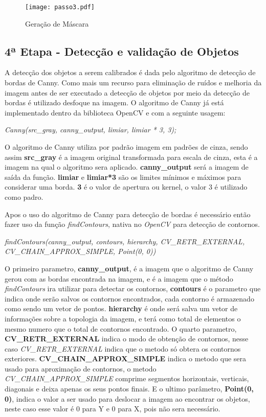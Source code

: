 \begin{figure}[H]
			\centering
			\texttt{[image: passo3.pdf]}
			\caption{Geração de Máscara}
			\label{Configuracao}
		\end{figure}		


\subsection{4ª Etapa - Detecção e validação de Objetos}
A detecção dos objetos a serem calibrados é dada pelo algoritmo de detecção de bordas de Canny. Como mais um recurso para eliminação de ruídos e melhoria da imagem antes de ser executado a detecção de objetos por meio da detecção de bordas é utilizado desfoque na imagem. O algoritmo de Canny já está implementado dentro da biblioteca OpenCV e com a seguinte usagem:
\begin{center}
\centering \textit{  Canny(src\_gray, canny\_output, limiar, limiar * 3, 3);}
\end{center}
O algoritmo de Canny utiliza por padrão imagem em padrões de cinza, sendo assim \textbf{src\_gray} é a imagem original transformada para escala de cinza, esta é a imagem na qual o algoritmo sera aplicado. \textbf{canny\_output} será a imagem de saída da função.
\textbf{limiar} e \textbf{limiar*3} são os limites mínimos e máximos para considerar uma borda. \textbf{3} é o valor de apertura ou kernel, o valor 3 é utilizado como padro.

Apos o uso do algoritmo de Canny para detecção de bordas é necessário então fazer uso da função \textit{findContours}, nativa no \textit{OpenCV} para detecção de contornos.
\begin{center}
\centering \textit{ findContours(canny\_output, contours, hierarchy, CV\_RETR\_EXTERNAL, CV\_CHAIN\_APPROX\_SIMPLE, Point(0, 0))}
\end{center}

O primeiro parametro, \textbf{canny\_output}, é a imagem que o algoritmo de Canny gerou com as bordas encontrada na imagem, e é a imagem que o método \textit{findContours} ira utilizar para detectar os contornos, \textbf{contours} é o parametro que indica onde serão salvos os contornos encontrados, cada contorno é armazenado como sendo um vetor de pontos\cite{OpenCV}. \textbf{hierarchy} é onde será salva um vetor de informações sobre a topologia da imagem, e terá como total de elementos o mesmo numero que o total de contornos encontrado\cite{OpenCV}. O quarto parametro, \textbf{CV\_RETR\_EXTERNAL} indica o modo de obtenção de contornos, nesse caso \textit{CV\_RETR\_EXTERNAL} indica que o metodo só obtera os contornos exteriores\cite{OpenCV}. \textbf{CV\_CHAIN\_APPROX\_SIMPLE} indica o metodo que sera usado para aproximação de contornos, o metodo \textit{CV\_CHAIN\_APPROX\_SIMPLE} comprime segmentos horizontais, verticais, diagonais e deixa apenas os seus pontos finais\cite{OpenCV}. E o ultimo parâmetro, \textbf{Point(0, 0)}, indica o valor a ser usado para deslocar a imagem ao encontrar os objetos, neste caso esse valor é 0 para Y e 0 para X, pois não sera necessário. 

